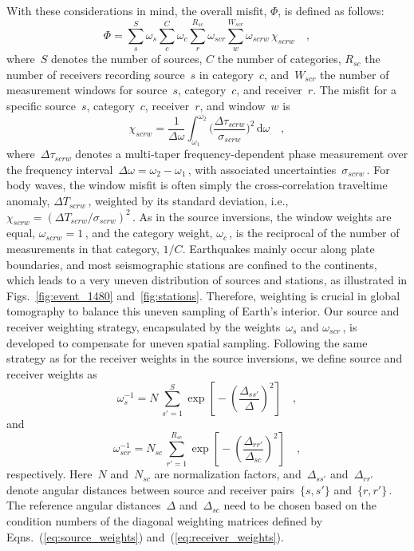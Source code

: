 With these considerations in mind,
the overall misfit, $\Phi$, is defined as follows:
\begin{equation}
\label{eq:misfit}
\Phi = \sum_{s}^{S} \omega_s \sum_{c}^{C} \omega_{c} \sum_{r}^{R_{sc}} \omega_{scr} \sum_{w}^{W_{scr}} \omega_{scrw}\, \chi_{scrw}
\quad ,
\end{equation}
where~$S$ denotes the number of sources, $C$ the number of categories,
$R_{sc}$ the number of receivers recording source~$s$ in category~$c$,
and~$W_{scr}$ the number of measurement windows for source~$s$, category~$c$,
and receiver~$r$.
The misfit for a specific source~$s$, category~$c$, receiver~$r$, and window~$w$ is
\begin{equation}
  \chi_{scrw} = \frac{1}{\Delta\omega}\int_{\omega_1}^{\omega_2} \Big( \frac {\Delta \tau_{scrw}} {\sigma_{scrw}} \Big)^2\, \mathrm{d}\omega
\quad ,
\end{equation}
where~$\Delta \tau_{scrw}$ denotes a multi-taper frequency-dependent phase measurement over the frequency interval~$\Delta\omega=\omega_2-\omega_1$\,,
with associated uncertainties~$\sigma_{scrw}$\,.
For body waves, the window misfit is often simply the cross-correlation traveltime anomaly,
$\Delta T_{scrw}$\,, weighted by its standard deviation, i.e., $\chi_{scrw}=(\Delta T_{scrw}/\sigma_{scrw})^2$\,.
As in the source inversions,
the window weights are equal, $\omega_{scrw}=1$\,,
and the category weight, $\omega_c$\,, is the reciprocal of the number of measurements in that
category, $1/C$.
Earthquakes mainly occur along plate boundaries,
and most seismographic  stations are confined to the continents,
which leads to a very uneven distribution of sources and stations,
as illustrated in Figs.~\ref{fig:event_1480} and~\ref{fig:stations}.
Therefore, weighting is crucial in global tomography to balance this uneven sampling
of Earth's interior.
Our source and receiver weighting strategy,
encapsulated by the weights~$\omega_s$ and $\omega_{scr}$\,,
is developed to compensate for uneven spatial sampling.
Following the same strategy as for the receiver weights in the source inversions,
we define source and receiver weights as
\begin{equation}
\omega_{s}^{-1} = N\,\sum_{s'=1}^{S} \exp\left[\mbox{}-\left(\frac{\Delta_{ss'}}{\Delta}\right)^2\right]
\quad ,
\label{eq:source_weights}
\end{equation}
and
\begin{equation}
\omega_{scr}^{-1} = N_{sc}\,\sum_{r'=1}^{R_{sc}} \exp\left[\mbox{}-\left(\frac{\Delta_{rr'}}{\Delta_{sc}}\right)^2\right]
\quad ,
\label{eq:receiver_weights}
\end{equation}
respectively.
Here~$N$ and~$N_{sc}$ are normalization factors,
and~$\Delta_{ss'}$ and~$\Delta_{rr'}$ denote angular distances between source and receiver pairs~$\{s,s'\}$ and~$\{r,r'\}$\,.
The reference angular distances~$\Delta$ and~$\Delta_{sc}$ need to be chosen based on the condition 
numbers of the diagonal weighting matrices defined by Eqns.~(\ref{eq:source_weights}) and~(\ref{eq:receiver_weights}).

